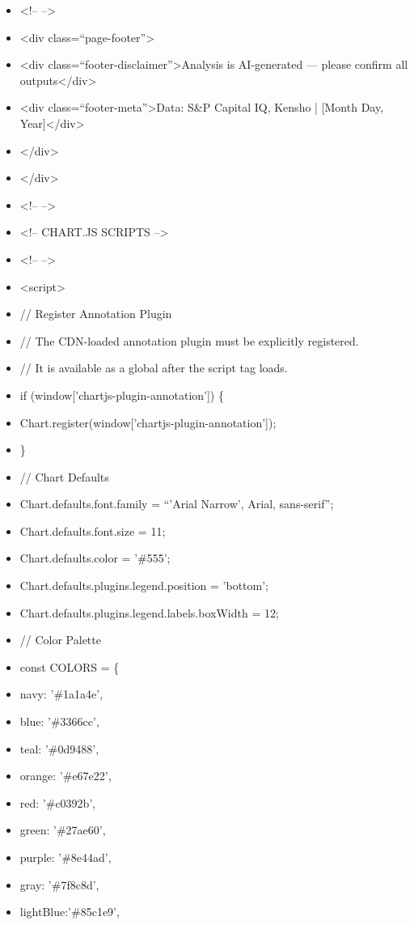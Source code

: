 \documentclass[11pt]{article}
\begin{document}
\begin{itemize}[leftmargin=*,itemsep=2pt,topsep=2pt]
\item {} <!-- -->
\item {} <div class=``page-footer''>
\item {} <div class=``footer-disclaimer''>Analysis is AI-generated — please confirm all outputs</div>
\item {} <div class=``footer-meta''>Data: S\&P Capital IQ, Kensho | [Month Day, Year]</div>
\item {} </div>
\item {} </div>
\item {} <!-- -->
\item {} <!-- CHART.JS SCRIPTS -->
\item {} <!-- -->
\item {} <script>
\item {} // Register Annotation Plugin
\item {} // The CDN-loaded annotation plugin must be explicitly registered.
\item {} // It is available as a global after the script tag loads.
\item {} if (window['chartjs-plugin-annotation']) \{
\item {} Chart.register(window['chartjs-plugin-annotation']);
\item {} \}
\item {} // Chart Defaults
\item {} Chart.defaults.font.family = ``'Arial Narrow', Arial, sans-serif'';
\item {} Chart.defaults.font.size = 11;
\item {} Chart.defaults.color = '\#555';
\item {} Chart.defaults.plugins.legend.position = 'bottom';
\item {} Chart.defaults.plugins.legend.labels.boxWidth = 12;
\item {} // Color Palette
\item {} const COLORS = \{
\item {} navy: '\#1a1a4e',
\item {} blue: '\#3366cc',
\item {} teal: '\#0d9488',
\item {} orange: '\#e67e22',
\item {} red: '\#c0392b',
\item {} green: '\#27ae60',
\item {} purple: '\#8e44ad',
\item {} gray: '\#7f8c8d',
\item {} lightBlue:'\#85c1e9',

\end{itemize}
\end{document}
